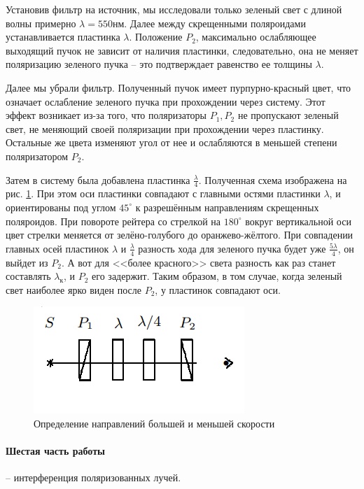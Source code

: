 Установив фильтр на источник, мы исследовали только зеленый свет с длиной волны примерно $\lambda = 550\text{нм}$. Далее между скрещенными поляроидами устанавливается пластинка $\lambda$. Положение $P_2$, максимально ослабляющее выходящий пучок не зависит от наличия пластинки, следовательно, она не меняет поляризацию зеленого пучка -- это подтверждает равенство ее толщины $\lambda$.

Далее мы убрали фильтр. Полученный пучок имеет пурпурно-красный цвет, что означает ослабление зеленого пучка при прохождении через систему. Этот эффект возникает из-за того, что поляризаторы $P_1, P_2$ не пропускают зеленый свет, не меняющий своей поляризации при прохождении через пластинку. Остальные же цвета изменяют угол от нее и ослабляются в меньшей степени поляризатором $P_2$.

Затем в систему была добавлена пластинка $\frac \lambda 4$. Полученная схема изображена на рис. \ref{fig:Axis}. При этом оси пластинки совпадают с главными остями пластинки $\lambda$, и ориентированы под углом $45^{\circ}$ к разрешённым направлениям скрещенных поляроидов. При повороте рейтера со стрелкой на $180^{\circ}$ вокруг вертикальной оси цвет стрелки меняется от зелёно-голубого до оранжево-жёлтого. При совпадении главных осей пластинок $\lambda$ и $\frac \lambda 4$ разность хода для зеленого пучка будет уже $\frac {5 \lambda} 4$, он выйдет из $P_2$. А вот для <<более красного>> света разность как раз станет составлять $\lambda_к$, и $P_2$ его задержит. Таким образом, в том случае, когда зеленый свет наиболее ярко виден после $P_2$, у пластинок совпадают оси.

\begin{figure}[!ht]
	\centering
	\includegraphics[width=0.5\linewidth]{pics/Axis.png}
	\caption{Определение направлений большей и меньшей скорости}
	\label{fig:Axis}
\end{figure}

\paragraph{Шестая часть работы} -- интерференция поляризованных лучей. 

